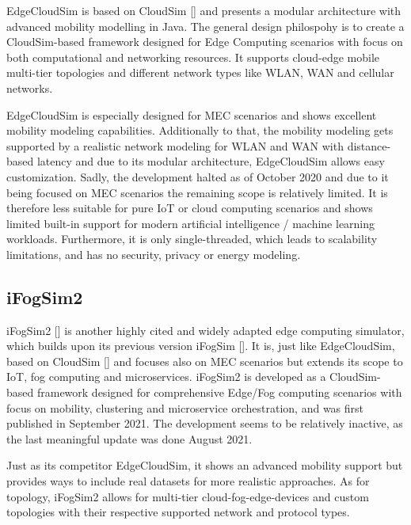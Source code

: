EdgeCloudSim is based on CloudSim [\cite{sim-base-cloudsim}] and presents a modular architecture with advanced mobility modelling in Java.
The general design philospohy is to create a CloudSim-based framework designed for Edge Computing scenarios with focus on both computational and networking resources.
It supports cloud-edge mobile multi-tier topologies and different network types like WLAN, WAN and cellular networks.

EdgeCloudSim is especially designed for MEC scenarios and shows excellent mobility modeling capabilities.
Additionally to that, the mobility modeling gets supported by a realistic network modeling for WLAN and WAN with distance-based latency and due to its modular architecture, EdgeCloudSim allows easy customization.
Sadly, the development halted as of October 2020 and due to it being focused on MEC scenarios the remaining scope is relatively limited.
It is therefore less suitable for pure IoT or cloud computing scenarios and shows limited built-in support for modern artificial intelligence / machine learning workloads.
Furthermore, it is only single-threaded, which leads to scalability limitations, and has no security, privacy or energy modeling.

\subsection{iFogSim2}\label{sec:iFogSim2}
iFogSim2 [\cite{sim-ifogsim2}] is another highly cited and widely adapted edge computing simulator, which builds upon its previous version iFogSim [\cite{sim-base-ifogsim1}].
It is, just like EdgeCloudSim, based on CloudSim [\cite{sim-base-cloudsim}] and focuses also on MEC scenarios but extends its scope to IoT, fog computing and microservices.
iFogSim2 is developed as a CloudSim-based framework designed for comprehensive Edge/Fog computing scenarios with focus on mobility, clustering and microservice orchestration, and was first published in September 2021.
The development seems to be relatively inactive, as the last meaningful update was done August 2021.

Just as its competitor EdgeCloudSim, it shows an advanced mobility support but provides ways to include real datasets for more realistic approaches.
As for topology, iFogSim2 allows for multi-tier cloud-fog-edge-devices and custom topologies with their respective supported network and protocol types.

